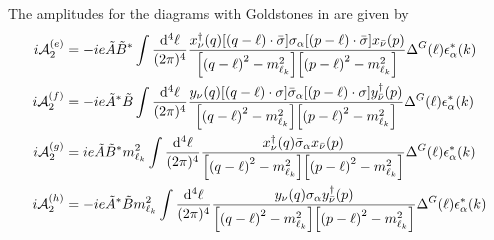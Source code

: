 The amplitudes for the diagrams with Goldstones in  are given by
\begin{align}
	i\mathcal{A}^{(e)}_{2}
	 & =
	-ie\tilde{A}\tilde{B}^{*}
	\int\frac{\dd[4]{\ell}}{(2\pi)^{4}}
	\frac{
	x_{\nu}^{\dagger}(q)
	\qty[\qty(q-\ell)\cdot\bar{\sigma}]\sigma_{\alpha}\qty[\qty(p-\ell)\cdot\bar{\sigma}]
	x_{\bar{\nu}}(p)
	}{
	\qty[\qty(q-\ell)^{2}-m_{\ell_{k}}^{2}]\qty[\qty(p-\ell)^{2}-m_{\ell_{k}}^{2}]
	}
	\Delta^{G}(\ell)
	\epsilon^{*}_{\alpha}(k)
	\\
	i\mathcal{A}^{(f)}_{2}
	 & =
	-ie\tilde{A}^{*}\tilde{B}
	\int\frac{\dd[4]{\ell}}{(2\pi)^{4}}
	\frac{
	y_{\nu}(q)
	\qty[\qty(q-\ell)\cdot\sigma]\bar{\sigma}_{\alpha}\qty[\qty(p-\ell)\cdot\sigma]
	y_{\bar{\nu}}^{\dagger}(p)
	}{
	\qty[\qty(q-\ell)^{2}-m_{\ell_{k}}^{2}]\qty[\qty(p-\ell)^{2}-m_{\ell_{k}}^{2}]
	}
	\Delta^{G}(\ell)
	\epsilon^{*}_{\alpha}(k)
	\\
	i\mathcal{A}^{(g)}_{2}
	 & =
	ie\tilde{A}\tilde{B}^{*}m^{2}_{\ell_{k}}
	\int\frac{\dd[4]{\ell}}{(2\pi)^{4}}
	\frac{
	x_{\nu}^{\dagger}(q)\bar{\sigma}_{\alpha}x_{\bar{\nu}}(p)
	}{
	\qty[\qty(q-\ell)^{2}-m_{\ell_{k}}^{2}]\qty[\qty(p-\ell)^{2}-m_{\ell_{k}}^{2}]
	}
	\Delta^{G}(\ell)
	\epsilon^{*}_{\alpha}(k)
	\\
	i\mathcal{A}^{(h)}_{2}
	 & =
	-ie\tilde{A}^{*}\tilde{B}m^{2}_{\ell_{k}}
	\int\frac{\dd[4]{\ell}}{(2\pi)^{4}}
	\frac{
	y_{\nu}(q)\sigma_{\alpha}y_{\bar{\nu}}^{\dagger}(p)
	}{
	\qty[\qty(q-\ell)^{2}-m_{\ell_{k}}^{2}]\qty[\qty(p-\ell)^{2}-m_{\ell_{k}}^{2}]
	}
	\Delta^{G}(\ell)
	\epsilon^{*}_{\alpha}(k)
\end{align}
